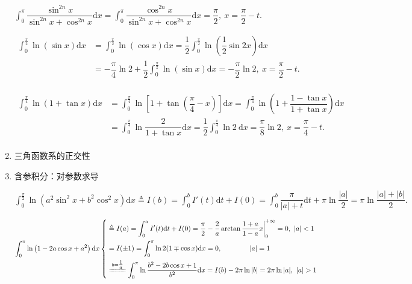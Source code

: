 \documentclass[UTF8]{ctexart}
\numberwithin{equation}{section}
\numberwithin{figure}{section}
\numberwithin{table}{section}
\newcommand\dif{\mathrm{d}}
\newcommand\dis{\displaystyle}
\newcommand\intd{\dis\int}
\begin{document}
\begin{spacing}{2}
\begin{enumerate}[itemindent=1.4em, label=(\arabic*)]
\vspace{0.3cm}

$\intd_0^\pi \dfrac{\sin^{2n}x}{\sin^{2n}x+\cos^{2n}x}\dif x=
\intd_0^\pi \dfrac{\cos^{2n}x}{\sin^{2n}x+\cos^{2n}x}\dif x=\dfrac{\pi}{2},\ 
x=\dfrac{\pi}{2}-t.$

\vspace{0.3cm}

$\begin{aligned}
\intd_0^{\tfrac{\pi}{2}}\ln (\sin x)\dif x&=\intd_0^{\tfrac{\pi}{2}}\ln (\cos x)\dif x=
\dfrac{1}{2}\intd_0^{\tfrac{\pi}{2}}\ln \left(\dfrac{1}{2}\sin 2x\right)\dif x\\
&=-\dfrac{\pi}{4}\ln 2+\dfrac{1}{2}\intd_0^{\tfrac{\pi}{2}}\ln (\sin x)\dif x=
-\dfrac{\pi}{2}\ln 2,\ x=\dfrac{\pi}{2}-t.\\
\end{aligned}$

$\begin{aligned}
\intd_0^{\tfrac{\pi}{4}}\ln(1+\tan x)\dif x
&=\intd_0^{\tfrac{\pi}{4}}\ln\left[1+\tan \left(\dfrac{\pi}{4}-x\right)\right]\dif x
=\intd_0^{\tfrac{\pi}{4}}\ln\left(1+\dfrac{1-\tan x}{1+\tan x}\right)\dif x\\
&=\intd_0^{\tfrac{\pi}{4}}\ln\dfrac{2}{1+\tan x}\dif x
=\dfrac{1}{2}\intd_0^{\tfrac{\pi}{4}}\ln2\ \dif x=\dfrac{\pi}{8}\ln2,\ x=\dfrac{\pi}{4}-t.\\
\end{aligned}$

\item 三角函数系的正交性

\item 含参积分：对参数求导

$\intd_0^{\tfrac{\pi}{2}}\ln\left(a^2\sin^2x+b^2\cos^2x\right)\dif x
\triangleq I(b)
=\intd_0^{b}I'(t)\dif t+I(0)
=\intd_0^{b}\dfrac{\pi}{|a|+t}\dif t+\pi\ln\dfrac{|a|}{2}
=\pi\ln\dfrac{|a|+|b|}{2}.$

$\intd_0^\pi\ln\left(1-2a\cos x+a^2\right)\dif x
\left\{\begin{aligned}
&\triangleq I(a)=\intd_0^{a}I'(t)\dif t+I(0)
=\dfrac{\pi}{2}-\dfrac{2}{a}\arctan\dfrac{1+a}{1-a}x\bigg|_0^{+\infty}=0,\ |a|<1\\
&=I(\pm1)=\intd_0^\pi\ln2(1\mp\cos x)\dif x=0,\qquad\qquad |a|=1\\
&\xlongequal{b=\tfrac{1}{a}}
\intd_0^\pi\ln\dfrac{b^2-2b\cos x+1}{b^2}\dif x
=I(b)-2\pi\ln|b|=2\pi\ln|a|,\ |a|>1\\
\end{aligned}\right.$


\end{enumerate}
\end{spacing}
\end{document}

